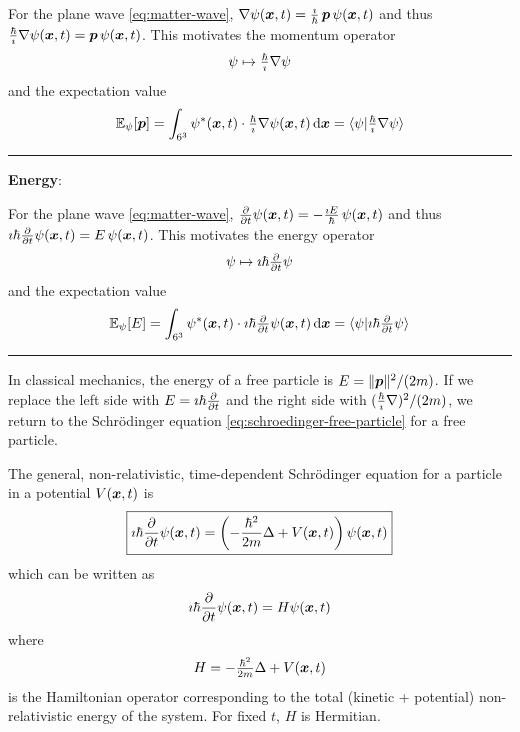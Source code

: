 For the plane wave \eqref{eq:matter-wave},
\(
\nabla \psi({\boldsymbol{x}}, t)
=
\frac{\imath}{\hbar}\,{\boldsymbol{p}}\,\psi({\boldsymbol{x}}, t)
\)
and thus
\(
\frac{\hbar}{\imath}\nabla \psi({\boldsymbol{x}}, t)
=
{\boldsymbol{p}}\,\psi({\boldsymbol{x}}, t)
\).
This motivates the momentum operator
\[
\psi \mapsto \tfrac{\hbar}{\imath} \nabla \psi
\]
and the expectation value
\[
\operatorname{\mathbb{E}}_\psi[{\boldsymbol{p}}]
= \int_{6^3} \psi^*({\boldsymbol{x}}, t) \cdot \tfrac{\hbar}{\imath} \nabla \psi({\boldsymbol{x}}, t) \,\mathrm{d}{\boldsymbol{x}} 
= \braket{\psi | \tfrac{\hbar}{\imath} \nabla \psi}
\]
\hrule
\textbf{Energy}:

For the plane wave \eqref{eq:matter-wave},
\(
\frac{\partial}{\partial t}\psi({\boldsymbol{x}}, t)
=
-\frac{\imath E}{\hbar}\,\psi({\boldsymbol{x}}, t)
\)
and thus
\(
\imath \hbar \frac{\partial}{\partial t}\psi({\boldsymbol{x}}, t)
=
E\,\psi({\boldsymbol{x}}, t)
\).
This motivates the energy operator
\[
\psi \mapsto \imath \hbar \tfrac{\partial}{\partial t} \psi
\]
and the expectation value
\[
\operatorname{\mathbb{E}}_\psi[E]
= \int_{6^3} \psi^*({\boldsymbol{x}}, t) \cdot \imath \hbar \tfrac{\partial}{\partial t} \psi({\boldsymbol{x}}, t) \,\mathrm{d}{\boldsymbol{x}} 
= \braket{\psi | \imath \hbar \tfrac{\partial}{\partial t} \psi}
\]
\hrule
\medskip


In classical mechanics, the energy of a free particle is $E = {\|{\boldsymbol{p}}\|^2}/{(2 m)}$.
If we replace the left side with 
$E = \imath \hbar \tfrac{\partial}{\partial t}$ 
and the right side with 
$(\tfrac{\hbar}{\imath} \nabla)^2 / (2 m)$, 
we return to the Schrödinger equation \eqref{eq:schroedinger-free-particle} for a free particle.

The general, non-relativistic, time-dependent Schrödinger equation for a particle in a potential $V({\boldsymbol{x}}, t)$ is
\begin{equation}\label{eq:schroedinger}
\boxed{
\imath \hbar \frac{\partial}{\partial t}\psi({\boldsymbol{x}}, t) = \left(-\frac{\hbar^2}{2 m} \Delta + V({\boldsymbol{x}}, t)  \right) \psi({\boldsymbol{x}}, t)
}
\end{equation}
which can be written as
\[
\imath \hbar  \frac{\partial}{\partial t}\psi({\boldsymbol{x}}, t) = H  \psi({\boldsymbol{x}}, t)
\]
where
\begin{equation}\label{eq:hamiltonian}
H = -\tfrac{\hbar^2}{2 m} \Delta + V({\boldsymbol{x}}, t)
\end{equation}
is the Hamiltonian operator
corresponding to the total (kinetic + potential) non-relativistic energy of the system. 
For fixed $t$, $H$ is Hermitian.

